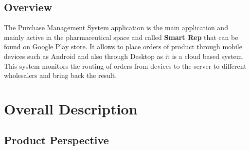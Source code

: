 \documentclass[a4paper,10pt]{article}
\begin{document}
	\subsection{Overview} 
	The Purchase Management System application is the main application and mainly active in the pharmaceutical space and called \textbf{Smart Rep} that can be found on Google Play store. It allows to place orders of product through mobile devices such as Android and also through Desktop as it is a cloud based system. This system monitors the routing of orders from devices to the server to different wholesalers and bring back the result.

	\newpage

\section{Overall Description}

\subsection{Product Perspective}
\end{document}
